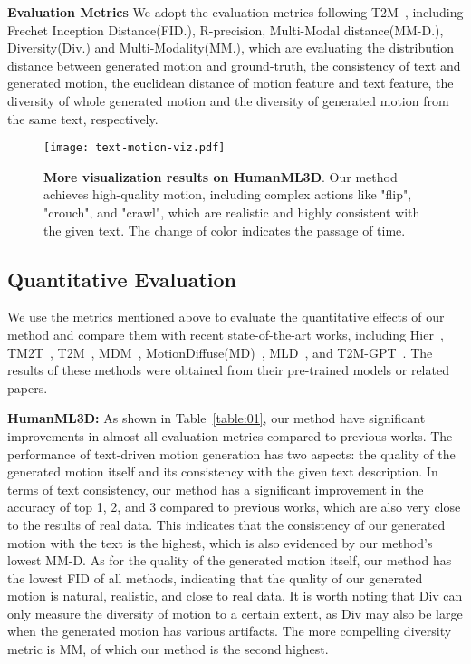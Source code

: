 \documentclass[10pt,twocolumn,letterpaper]{article}
\begin{document}
\textbf{Evaluation Metrics}\quad
We adopt the evaluation metrics following T2M~\cite{guo2022generating}, including Frechet Inception Distance(FID.), R-precision, Multi-Modal distance(MM-D.), Diversity(Div.) and Multi-Modality(MM.), which are evaluating the distribution distance between generated motion and ground-truth, the consistency of text and generated motion, the euclidean distance of motion feature and text feature, the diversity of whole generated motion and the diversity of generated motion from the same text, respectively.




\begin{figure*}[t]
    \centering
    \texttt{[image: text-motion-viz.pdf]}
    \caption{\textbf{More visualization results on HumanML3D}. Our method achieves high-quality motion, including complex actions like "flip", "crouch", and "crawl", which are realistic and highly consistent with the given text. The change of color indicates the passage of time.}
    \label{img:04}
\end{figure*}



\subsection{Quantitative Evaluation}\label{ssec:sota_quanti}

We use the metrics mentioned above to evaluate the quantitative effects of our method and compare them with recent state-of-the-art works, including Hier~\cite{ghosh2021synthesis}, TM2T~\cite{guo2022tm2t}, T2M~\cite{guo2022generating}, MDM~\cite{tevet2023human}, MotionDiffuse(MD)~\cite{zhang2022motiondiffuse}, MLD~\cite{chen2023mld}, and T2M-GPT~\cite{zhang2023t2m}. The results of these methods were obtained from their pre-trained models or related papers.



\textbf{HumanML3D:} As shown in Table~\ref{table:01}, our method have significant improvements in almost all evaluation metrics compared to previous works. The performance of text-driven motion generation has two aspects: the quality of the generated motion itself and its consistency with the given text description. In terms of text consistency, our method has a significant improvement in the accuracy of top 1, 2, and 3 compared to previous works, which are also very close to the results of real data. This indicates that the consistency of our generated motion with the text is the highest, which is also evidenced by our method's lowest MM-D. As for the quality of the generated motion itself, our method has the lowest FID of all methods, indicating that the quality of our generated motion is natural, realistic, and close to real data. It is worth noting that Div can only measure the diversity of motion to a certain extent, as Div may also be large when the generated motion has various artifacts. The more compelling diversity metric is MM, of which our method is the second highest.
\end{document}
